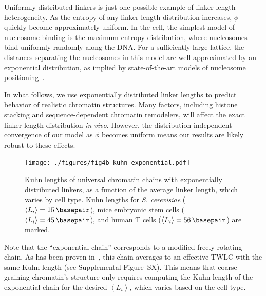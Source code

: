\documentclass[%
 reprint,
superscriptaddress,
showpacs,preprintnumbers,
 amsmath,amssymb,
 aps,
 prl,
]{revtex4-1}
\newcommand{\meanli}{\left\langle{}L_i\right\rangle}
\begin{document}
Uniformly distributed linkers is just one possible example of linker length heterogeneity.
As the entropy of any linker length distribution
increases, $\phi$ quickly become approximately uniform.
In the cell, the simplest model of nucleosome binding is the maximum-entropy
    distribution, where nucleosomes bind uniformly randomly along the DNA\@.
For a sufficiently large lattice, the distances separating the nucleosomes in this
    model are well-approximated by an exponential distribution, as implied by
    state-of-the-art models of nucleosome positioning~\cite{beshnova2014}.

In what follows, we use exponentially distributed linker lengths to predict
    behavior of realistic chromatin structures.
Many factors, including histone stacking and sequence-dependent chromatin
    remodelers, will affect the exact linker-length distribution \textit{in vivo}.
However, the distribution-independent convergence of our model as $\phi$ becomes
    uniform means our results are likely robust to these effects.

\begin{figure}
    \centering
    \texttt{[image: ./figures/fig4b\_kuhn\_exponential.pdf]}
    \caption{Kuhn lengths of universal chromatin chains with exponentially
    distributed linkers, as a function of the average linker length, which
    varies by cell type. Kuhn lengths for \textit{S. cerevisiae}
    ($\meanli=\SI{15}{\basepair}$), mice embryonic stem cells
    ($\meanli=\SI{45}{\basepair}$), and human T cells
    ($\meanli=\SI{56}{\basepair}$) are marked.}\label{fig:exp-chain}
\end{figure}

Note that the ``exponential chain'' corresponds to a modified freely rotating
    chain.
As has been proven in~\cite{kilanowski2017}, this chain averages to an effective
    TWLC with the same Kuhn length (see Supplemental Figure~SX).
This means that coarse-graining chromatin's structure only requires computing
    the Kuhn length of the exponential chain for the desired $\meanli$, which
    varies based on the cell type.
\end{document}
